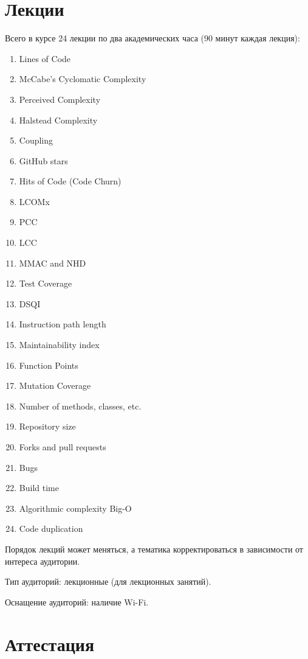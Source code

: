\documentclass[nobrand,anonymous,nodate,nosecurity]{huawei}
\begin{document}
\section{Лекции}

Всего в курсе 24 лекции по два академических часа (90 минут каждая лекция):
\begin{enumerate}
    \setlength\itemsep{0em}
    \item Lines of Code
    \item McCabe's Cyclomatic Complexity
    \item Perceived Complexity
    \item Halstead Complexity
    \item Coupling
    \item GitHub stars
    \item Hits of Code (Code Churn)
    \item LCOMx
    \item PCC
    \item LCC
    \item MMAC and NHD
    \item Test Coverage
    \item DSQI
    \item Instruction path length
    \item Maintainability index
    \item Function Points
    \item Mutation Coverage
    \item Number of methods, classes, etc.
    \item Repository size
    \item Forks and pull requests
    \item Bugs
    \item Build time
    \item Algorithmic complexity Big-O
    \item Code duplication
\end{enumerate}

Порядок лекций может меняться, а тематика корректироваться в зависимости от интереса аудитории.

Тип аудиторий: лекционные (для лекционных занятий).

Оснащение аудиторий: наличие Wi-Fi.

\section{Аттестация}
\end{document}
